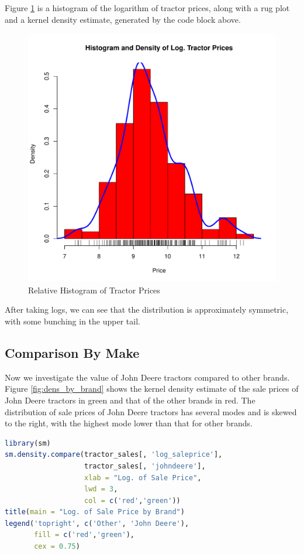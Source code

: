 \documentclass[11pt]{book}
\begin{document}
Figure \ref{fig:hist_dens_log_price} is
a histogram of the logarithm of tractor prices, 
along with a rug plot and a kernel density estimate, 
generated by the code block above.
%
\begin{figure}[h!]
  \centering
  \includegraphics[scale = 0.5, keepaspectratio=true]{../Figures/hist_dens_log_price}
  \caption{Relative Histogram of Tractor Prices} \label{fig:hist_dens_log_price}
\end{figure}
% 
After taking logs, we can see that the distribution is
approximately symmetric, with some bunching in the
upper tail. 

\pagebreak
\subsection{Comparison By Make}

Now we investigate the value of John Deere tractors 
compared to other brands.
Figure \ref{fig:dens_by_brand} shows the 
kernel density estimate of the sale prices of John Deere tractors
in green and that of the other brands in red.
% 
The distribution of sale prices of John Deere tractors has several modes and is skewed to the right, 
with the highest mode lower than that for other brands. 


\begin{lstlisting}[language=R]
library(sm)
sm.density.compare(tractor_sales[, 'log_saleprice'],
                   tractor_sales[, 'johndeere'],
                   xlab = "Log. of Sale Price",
                   lwd = 3,
                   col = c('red','green'))
title(main = "Log. of Sale Price by Brand")
legend('topright', c('Other', 'John Deere'),
       fill = c('red','green'),
       cex = 0.75)
\end{lstlisting}
\end{document}

